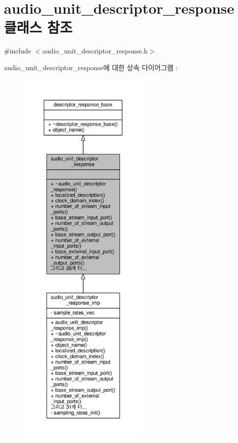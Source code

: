 \hypertarget{classavdecc__lib_1_1audio__unit__descriptor__response}{}\section{audio\+\_\+unit\+\_\+descriptor\+\_\+response 클래스 참조}
\label{classavdecc__lib_1_1audio__unit__descriptor__response}


{\ttfamily \#include $<$audio\+\_\+unit\+\_\+descriptor\+\_\+response.\+h$>$}



audio\+\_\+unit\+\_\+descriptor\+\_\+response에 대한 상속 다이어그램 \+: 
\nopagebreak
\begin{figure}[H]
\begin{center}
\leavevmode
\includegraphics[height=550pt]{classavdecc__lib_1_1audio__unit__descriptor__response__inherit__graph}
\end{center}
\end{figure}


